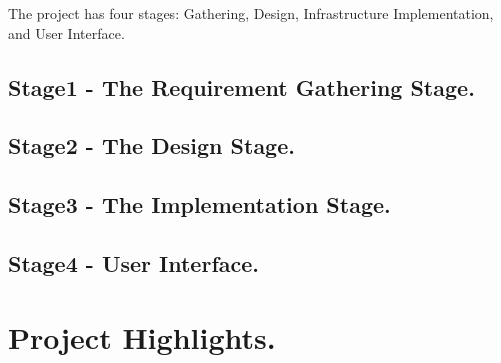 \documentclass[10pt,conference]{IEEEtran}
\begin{document}
The project has four stages: Gathering, Design, Infrastructure Implementation, and User Interface.

%
\subsection{Stage1 - The Requirement Gathering Stage. }\label{sec:1 Requirement Gathering Stage. }


\subsection{Stage2 - The Design Stage. }\label{sec: 2:The Design Stage.}


\subsection{Stage3 - The Implementation Stage. }\label{sec: 3 The Implementation Stage.}


\subsection{Stage4 -	User Interface. }\label{sec: 4. User Interface.}


\section{Project Highlights.}\label{sec:7. Project Highlights.}




%
%
\end{document}
